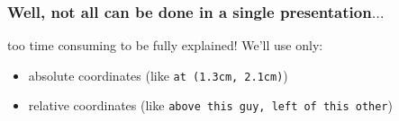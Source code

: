 \begin{frame}
	\frametitle{Well, not all can be done in a single presentation$\ldots$}
	\begin{center}
	\end{center}
	too time consuming to be fully explained! We'll use only:
	\begin{itemize}
		\item absolute coordinates (like \texttt{at (1.3cm, 2.1cm)})
		\item relative coordinates (like \texttt{above this guy, left of this other})
	\end{itemize}
	{
		\begin{center}
		\end{center}
	}
\end{frame}

